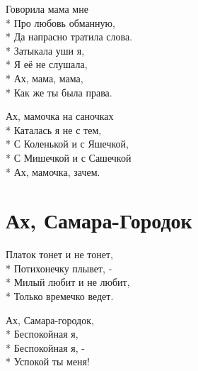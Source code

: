 \medskip

\begin{minipage}{\linewidth}
Говорила мама мне\\*
Про любовь обманную,\\*
Да напрасно тратила слова.\\*
Затыкала уши я,\\*
Я её не слушала,\\*
Ах, мама, мама,\\*
Как же ты была права.\\
\end{minipage}\par\medskip\nobreak

\medskip

\begin{minipage}{\linewidth}
\hspace*{1.5em}Ах, мамочка на саночках\\*
\hspace*{1.5em}Каталась я не с тем,\\*
\hspace*{1.5em}С Коленькой и с Яшечкой,\\*
\hspace*{1.5em}С Мишечкой и с Сашечкой\\*
\hspace*{1.5em}Ах, мамочка, зачем.\\
\end{minipage}

\vspace{\fill}\newpage

\section{Ах, Самара-Городок}
\label{song:Ах,_Самара-Городок}

\medskip

\begin{minipage}{\linewidth}
Платок тонет и не тонет,\\*
Потихонечку плывет, - \\*
Милый любит и не любит,\\*
Только времечко ведет.\\
\end{minipage}\par\medskip\nobreak

\medskip

\begin{minipage}{\linewidth}
\hspace*{1.5em}Ах, Самара-городок,\\*
\hspace*{1.5em}Беспокойная я,\\*
\hspace*{1.5em}Беспокойная я, - \\*
\hspace*{1.5em}Успокой ты меня!\\
\end{minipage}\par\medskip\nobreak

